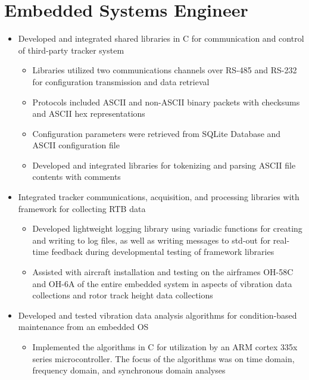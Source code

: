 \documentclass[10pt,a4paper]{article}
\begin{document}
\section{Embedded Systems Engineer}
\begin{itemize}
  \item Developed and integrated shared libraries in C for communication and control of
    third-party tracker system
    \begin{itemize}
      \item Libraries utilized two communications channels over RS-485 and RS-232 for
        configuration transmission and data retrieval

      \item Protocols included ASCII and non-ASCII binary packets with checksums and
        ASCII hex representations

      \item Configuration parameters were retrieved from SQLite Database and ASCII
        configuration file

      \item Developed and integrated libraries for tokenizing and parsing ASCII file
        contents with comments
    \end{itemize}

  \item Integrated tracker communications, acquisition, and processing libraries with
    framework for collecting RTB data
    \begin{itemize}
      \item Developed lightweight logging library using variadic functions for creating
        and writing to log files, as well as writing messages to std-out for real-time
        feedback during developmental testing of framework libraries

      \item Assisted with aircraft installation and testing on the airframes OH-58C and
        OH-6A of the entire embedded system in aspects of vibration data collections and
        rotor track height data collections
    \end{itemize}

  \item Developed and tested vibration data analysis algorithms for condition-based
    maintenance from an embedded OS
    \begin{itemize}
      \item Implemented the algorithms in C for utilization by an ARM cortex 335x series
        microcontroller. The focus of the algorithms was on time domain, frequency
        domain, and synchronous domain analyses


\end{itemize}
\end{itemize}
\end{document}
